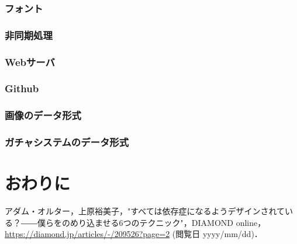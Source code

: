 \subsubsection{フォント}
\subsubsection{非同期処理}
\subsubsection{Webサーバ}
\subsubsection{Github}
\subsubsection{画像のデータ形式}
\subsubsection{ガチャシステムのデータ形式}
\section{おわりに}
\begin{thebibliography}{9}
   アダム・オルター，上原裕美子，"すべては依存症になるようデザインされている？――僕らをのめり込ませる6つのテクニック"，DIAMOND online，\url{https://diamond.jp/articles/-/209526?page=2} (閲覧日 yyyy/mm/dd)．
\end{thebibliography}
